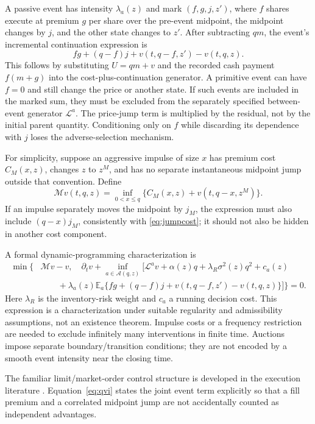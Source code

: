 \documentclass[11pt]{article}
\numberwithin{equation}{section}
\theoremstyle{definition}
\theoremstyle{remark}
\newcommand{\E}{\mathbb{E}}
\theoremstyle{definition}
\newcommand{\A}{\mathcal A}
\begin{document}
A passive event has intensity $\lambda_a(z)$ and mark $(f,g,j,z')$, where
$f$ shares execute at premium $g$ per share over the pre-event midpoint,
the midpoint changes by $j$, and the other state changes to $z'$.
After subtracting $qm$, the event's incremental continuation expression is
\begin{equation}\label{eq:jumpcost}
 fg+(q-f)j+v(t,q-f,z')-v(t,q,z).
\end{equation}
This follows by substituting $U=qm+v$ and the recorded cash payment
$f(m+g)$ into the cost-plus-continuation generator. A primitive event can
have $f=0$ and still change the price or another state. If such events are
included in the marked sum, they must be excluded from the separately
specified between-event generator $\mathcal L^a$.
The price-jump term is multiplied by the residual, not by the initial parent
quantity. Conditioning only on $f$ while discarding its dependence with $j$
loses the adverse-selection mechanism.

For simplicity, suppose an aggressive impulse of size $x$ has premium cost
$C_M(x,z)$, changes $z$ to $z^M$, and has no separate instantaneous midpoint
jump outside that convention. Define
\begin{equation}
 \mathcal Mv(t,q,z)=\inf_{0<x\leq q}
               \{C_M(x,z)+v(t,q-x,z^M)\}.
\end{equation}
If an impulse separately moves the midpoint by $j_M$, the expression must
also include $(q-x)j_M$, consistently with \eqref{eq:jumpcost}; it should not
also be hidden in another cost component.

A formal dynamic-programming characterization is
\begin{align}\label{eq:qvi}
 \min\Bigg\{&\mathcal Mv-v,\quad
 \partial_tv+\inf_{a\in\A(q,z)}\Big[\mathcal L^av+
              \alpha(z)q+\lambda_R\sigma^2(z)q^2+c_a(z)\\
 &\qquad+\lambda_a(z)\E_a\{
       fg+(q-f)j+v(t,q-f,z')-v(t,q,z)\}\Big]\Bigg\}=0.\nonumber
\end{align}
Here $\lambda_R$ is the inventory-risk weight and $c_a$ a running decision
cost. This expression is a characterization under suitable regularity and
admissibility assumptions, not an existence theorem. Impulse costs or a
frequency restriction are needed to exclude infinitely many interventions
in finite time. Auctions impose separate boundary/transition conditions;
they are not encoded by a smooth event intensity near the closing time.

The familiar limit/market-order control structure is developed in the
execution literature \citep{cartea2015}. Equation~\eqref{eq:qvi} states the
joint event term explicitly so that a fill premium and a correlated midpoint
jump are not accidentally counted as independent advantages.
\end{document}
